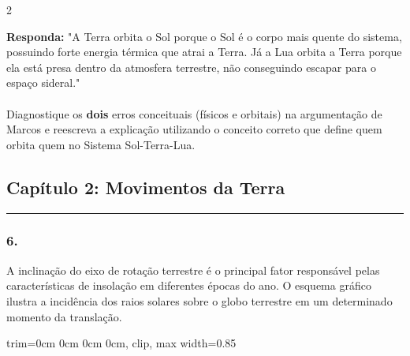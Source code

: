 \documentclass[twoside, 10pt, a4paper]{article}
\newlength{\espacoPosTitulo}\setlength{\espacoPosTitulo}{0.3cm}
\newlength{\espacoQuestao}\setlength{\espacoQuestao}{0.2cm}
\newcommand{\larguraTikz}{0.85\linewidth}
\begin{document}
\begin{multicols*}{2}
\begin{boxresponda}
\textbf{Responda:} "A Terra orbita o Sol porque o Sol é o corpo mais quente do sistema, possuindo forte energia térmica que atrai a Terra. Já a Lua orbita a Terra porque ela está presa dentro da atmosfera terrestre, não conseguindo escapar para o espaço sideral."\\
\\
Diagnostique os \textbf{dois} erros conceituais (físicos e orbitais) na argumentação de Marcos e reescreva a explicação utilizando o conceito correto que define quem orbita quem no Sistema Sol-Terra-Lua.
\end{boxresponda}
\par\vspace{\espacoQuestao}

\subsection*{Capítulo 2: Movimentos da Terra}
\vspace{-0.2cm}\noindent\rule{\linewidth}{1.5pt} 
\par\vspace{\espacoPosTitulo}
\subsubsection*{6.} A inclinação do eixo de rotação terrestre é o principal fator responsável pelas características de insolação em diferentes épocas do ano. O esquema gráfico ilustra a incidência dos raios solares sobre o globo terrestre em um determinado momento da translação. 

\begin{center}
\begin{adjustbox}{trim=0cm 0cm 0cm 0cm, clip, max width=\larguraTikz}
\end{adjustbox}
\end{center}
\end{multicols*}
\end{document}
